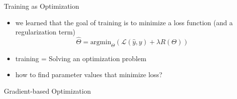 \begin{frame}{Training as Optimization}
    \begin{itemize}
        \item<1-> we learned that the goal of training is to minimize a loss function (and a regularization term)
        \begin{equation*}
            \hat{\Theta} =\text{argmin}_{\Theta} \left( \mathcal{L}(\hat{y},y)  + \lambda R(\Theta) \right)
        \end{equation*}
        \item<2-> training = Solving an optimization problem
        \item<3-> how to find parameter values that minimize loss?
    \end{itemize}
\end{frame}
\begin{frame}{Gradient-based Optimization}
   

\end{frame}

